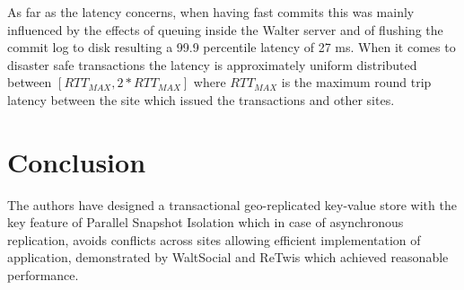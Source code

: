 \documentclass[a4paper]{article}
\begin{document}
As far as the latency concerns, when having fast commits this was mainly influenced by the effects of queuing inside the Walter server and of flushing the commit log to disk resulting a 99.9 percentile latency of 27 ms. When it comes to disaster safe transactions the latency is approximately uniform distributed between $[RTT_{MAX},2*RTT_{MAX}]$ where $RTT_{MAX}$ is the maximum round trip latency between the site which issued the transactions and other sites.


\section{Conclusion}

The authors have designed a transactional geo-replicated key-value store with the key feature of Parallel Snapshot Isolation which in case of asynchronous replication, avoids conflicts across sites allowing efficient implementation of application, demonstrated by WaltSocial and ReTwis which achieved reasonable performance.  
\end{document}
